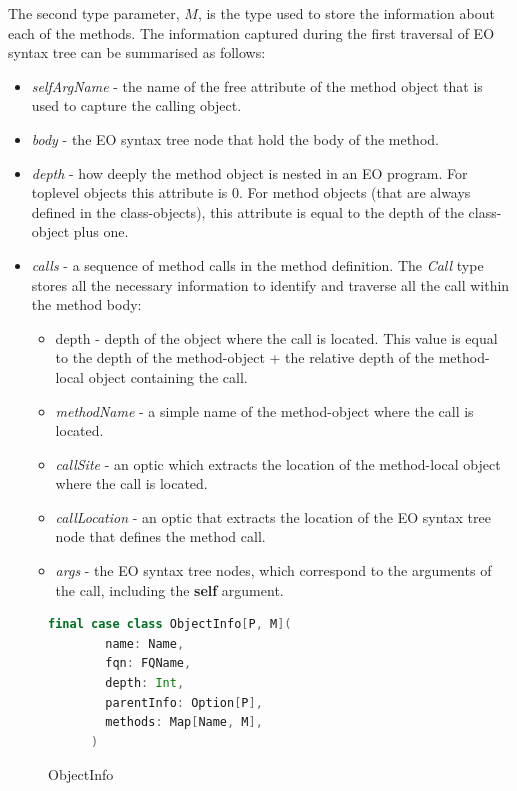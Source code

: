 The second type parameter, $M$, is the type used to store the information about each of the methods. The information captured during the first traversal of EO syntax tree  can be summarised as follows:
\begin{itemize}
    \item \textit{selfArgName} - the name of the free attribute of the method object that is used to capture the calling object. 
    \item \textit{body} - the EO syntax tree node that hold the body of the method. 
    \item \textit{depth} - how deeply the method object is nested in an EO program. For toplevel objects this attribute is $0$. For method objects (that are always defined in the class-objects), this attribute is equal to the depth of the class-object plus one.  
    \item \textit{calls} - a sequence of method calls in the method definition. The \textit{Call} type stores all the necessary information to identify and traverse all the call within the method body:
    \begin{itemize}
        \item depth - depth of the object where the call is located. This value is equal to the depth of the method-object + the relative depth of the method-local object containing the call.
        \item \textit{methodName} - a simple name of the method-object where the call is located.
        \item \textit{callSite} - an optic \cite{optics} which extracts the location of the method-local object where the call is located. 
        \item \textit{callLocation} - an optic \cite{optics} that extracts the location of the EO syntax tree node that defines the method call. 
        \item \textit{args} - the EO syntax tree nodes, which correspond to the arguments of the call, including the \textbf{self} argument.  
    \end{itemize}  
\end{itemize}

\begin{figure}
    \begin{lstlisting}[language=Scala]
      final case class ObjectInfo[P, M](
        name: Name,
        fqn: FQName,
        depth: Int,
        parentInfo: Option[P],
        methods: Map[Name, M],
      )
    \end{lstlisting}
    \caption{ObjectInfo}
    \label{fig:objinfo}
\end{figure}

